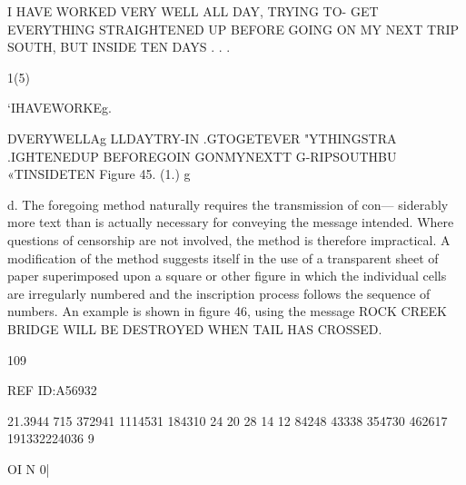I HAVE WORKED VERY WELL ALL DAY, TRYING TO- GET
EVERYTHING STRAIGHTENED UP BEFORE GOING ON MY
NEXT TRIP SOUTH, BUT INSIDE TEN DAYS . . .

 

 

 

 

 

 

 

 

 

 

 

 

 

 

 

 

 

 

 

 

 

 

1(5)

‘IHAVEWORKEg.

DVERYWELLAg
LLDAYTRY-IN
.GTOGETEVER
"YTHINGSTRA
.IGHTENEDUP
BEFOREGOIN
GONMYNEXTT
G-RIPSOUTHBU
«TINSIDETEN
Figure 45. (1.) g

d. The foregoing method naturally requires the transmission of con—
siderably more text than is actually necessary for conveying the message
intended. Where questions of censorship are not involved, the method
is therefore impractical. A modiﬁcation of the method suggests itself in
the use of a transparent sheet of paper superimposed upon a square or
other ﬁgure in which the individual cells are irregularly numbered and
the inscription process follows the sequence of numbers. An example is
shown in ﬁgure 46, using the message ROCK CREEK BRIDGE WILL
BE DESTROYED WHEN TAIL HAS CROSSED.

109

 

REF ID:A56932

 

21.3944 715
372941 1114531
184310 24 20 28 14
12 84248 43338
354730 462617
191332224036 9

OI
N
0|

 

 

 

 

 

